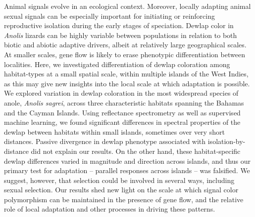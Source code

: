 Animal signals evolve in an ecological context. Moreover, locally adapting animal sexual signals can be especially important for initiating or reinforcing reproductive isolation during the early stages of speciation. Dewlap color in \textit{Anolis} lizards can be highly variable between populations in relation to both biotic and abiotic adaptive drivers, albeit at relatively large geographical scales. At smaller scales, gene flow is likely to erase phenotypic differentiation between localities. Here, we investigated differentiation of dewlap coloration among habitat-types at a small spatial scale, within multiple islands of the West Indies, as this may give new insights into the local scale at which adaptation is possible. We explored variation in dewlap coloration in the most widespread species of anole, \textit{Anolis sagrei}, across three characteristic habitats spanning the Bahamas and the Cayman Islands. Using reflectance spectrometry as well as supervised machine learning, we found significant differences in spectral properties of the dewlap between habitats within small islands, sometimes over very short distances. Passive divergence in dewlap phenotype associated with isolation-by-distance did not explain our results. On the other hand, these habitat-specific dewlap differences varied in magnitude and direction across islands, and thus our primary test for adaptation -- parallel responses across islands -- was falsified. We suggest, however, that selection could be involved in several ways, including sexual selection. Our results shed new light on the scale at which signal color polymorphism can be maintained in the presence of gene flow, and the relative role of local adaptation and other processes in driving these patterns.

